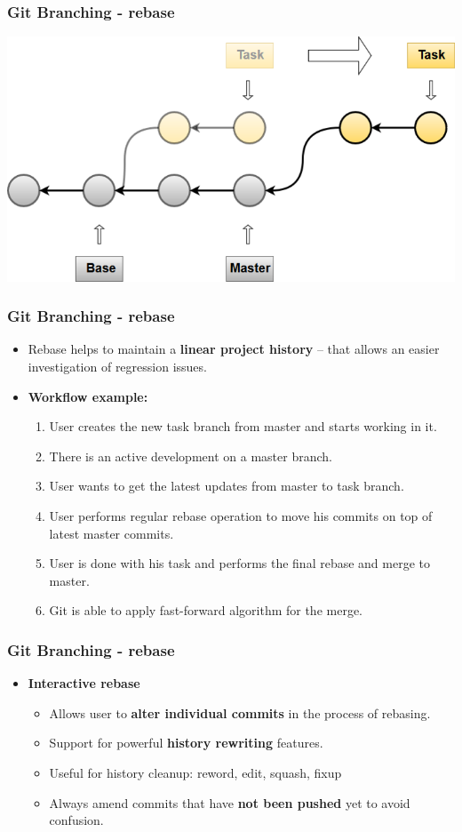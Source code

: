 \begin{frame}
\frametitle{Git Branching - rebase}
\includegraphics[width=\textwidth, height=0.55\textwidth]{rebase.png}
\end{frame}

\begin{frame}
\frametitle{Git Branching - rebase}
\begin{itemize}
	\item Rebase helps to maintain a \textbf{linear project history} – that allows an easier investigation of regression issues.
	\item \textbf{Workflow example:}
		\begin{enumerate}
		\item User creates the new task branch from master and starts working in it.
		\item There is an active development on a master branch.
		\item User wants to get the latest updates from master to task branch.
		\item User performs regular rebase operation to move his commits on top of latest master commits.
		\item User is done with his task and performs the final rebase and merge to master.
		\item Git is able to apply fast-forward algorithm for the merge.
		\end{enumerate}
\end{itemize}
\end{frame}

\begin{frame}
\frametitle{Git Branching - rebase}
\begin{itemize}
	\item \textbf{Interactive rebase}
		\begin{itemize}
		\item Allows user to \textbf{alter individual commits} in the process of rebasing.
		\item Support for powerful \textbf{history rewriting} features.
		\item Useful for history cleanup: reword, edit, squash, fixup
		\item Always amend commits that have \textbf{not been pushed} yet to avoid confusion.
		\end{itemize}
\end{itemize}
\end{frame}

